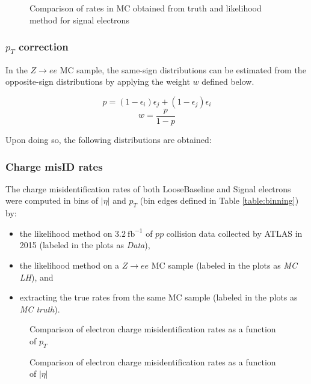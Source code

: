\begin{figure}[h]
\ContinuedFloat
\centering
{}
\caption{Comparison of rates in MC obtained from truth and likelihood method for signal electrons}
\label{fig:MCrates}
\end{figure}

\subsubsection*{$p_T$ correction}
In the $Z\rightarrow ee$ MC sample, the same-sign distributions can be estimated from the opposite-sign distributions by applying the weight $w$ defined below.

$$p =(1-\epsilon_i)\epsilon_j + (1-\epsilon_j)\epsilon_i$$
$$w = \frac{p}{1-p}$$

Upon doing so, the following distributions are obtained:

\subsubsection*{Charge misID rates}
The charge misidentification rates of both LooseBaseline and Signal electrons were computed in bins of $|\eta|$ and $p_T$ (bin edges defined in Table \ref{table:binning}) by:
\begin{itemize}
\item the likelihood method on $3.2\  \text{fb}^{-1}$ of $pp$ collision data collected by ATLAS in 2015 (labeled in the plots as \textit{Data}),
\item the likelihood method on a $Z\rightarrow ee$ MC sample (labeled in the plots as \textit{MC LH}), and
\item extracting the true rates from the same MC sample (labeled in the plots as \textit{MC truth}).
\end{itemize}

\begin{figure}[h!]
\centering
{}
\caption{Comparison of electron charge misidentification rates as a function of $p_T$}
\label{fig:rates-pt}
\end{figure}

\begin{figure}[h!]
\centering
{}
\caption{Comparison of electron charge misidentification rates as a function of $|\eta|$}
\label{fig:rates-eta}
\end{figure}




